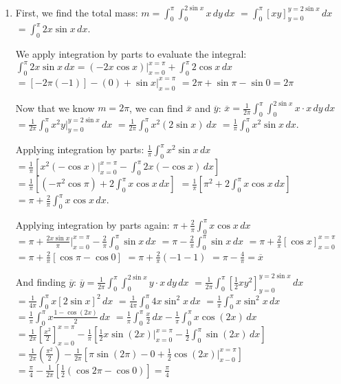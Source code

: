 \begin{Answer}[ref = c_of_m]
\begin{enumerate}
\item First, we find the total mass: $m = \int_0^{\pi} \int_0^{2\sin{x}} x \,dy
\,dx$ 
$= \int_0^{\pi} \left[ xy \right]_{y = 0}^{y = 2\sin{x}}\,dx$ $= \int_0^{\pi} 2
x\sin{x}\,dx$. 

We apply integration by parts to evaluate the integral: 
$\int_0^{\pi} 2x\sin{x}\,dx = \left(-2x \cos{x} \right)|_{x = 0}^{x = \pi} + 
\int_0^{\pi} 2 \cos{x}\,dx$ 
$= \left[-2 \pi (-1) \right] - \left( 0 \right) + \sin{x}|_{x = 0}^{x = \pi}$ 
$= 2\pi + \sin{\pi} - \sin{0} = 2\pi$

Now that we know $m = 2\pi$, we can find $\overline{x}$ and $\overline{y}$: 
$\overline{x} = \frac{1}{2\pi} \int_0^{\pi} \int_0^{2\sin{x}} x \cdot x \,dy 
\,dx$ 
$= \frac{1}{2\pi} \int_0^{\pi} x^2y|_{y = 0}^{y = 2\sin{x}}\,dx$ 
$= \frac{1}{2\pi} \int_0^{\pi} x^2 \left(2\sin{x} \right)\,dx$ 
$= \frac{1}{\pi} \int_0^{\pi} x^2 \sin{x}\,dx$. 

Applying integration by parts: $\frac{1}{\pi} \int_0^{\pi} x^2 \sin{x}\,dx$ 
$= \frac{1}{\pi} \left[ x^2 \left(-\cos{x} \right)|_{x = 0}^{x = \pi} - \int_0^
{\pi} 2x \left( -\cos{x} \right) \,dx \right]$ 
$= \frac{1}{\pi} \left[ \left( -\pi^2 \cos{\pi} \right) + 2\int_0^{\pi} x\cos{x
}\,dx \right]$ 
$= \frac{1}{\pi} \left[ \pi^2 + 2\int_0^{\pi} x\cos{x}\,dx \right]$ $= \pi + 
\frac{2}{\pi} \int_0^{\pi} x\cos{x}\,dx$. 

Applying integration by parts again: $\pi + \frac{2}{\pi} \int_0^{\pi} x\cos{x}
\,dx$ 
$= \pi + \frac{2x\sin{x}}{\pi}|_{x = 0}^{x = \pi} - \frac{2}{\pi} \int_0^{\pi} 
\sin{x}\,dx$
$= \pi -\frac{2}{\pi} \int_0^{\pi} \sin{x}\,dx$
$= \pi + \frac{2}{\pi} \left[ \cos{x} \right]_{x = 0}^{x = \pi}$
$= \pi + \frac{2}{\pi} \left[ \cos{\pi} - \cos{0} \right]$
$= \pi + \frac{2}{\pi} \left(-1 - 1 \right)$ $= \pi - \frac{4}{\pi} = 
\overline{x}$

And finding $\overline{y}$: 
$\overline{y} = \frac{1}{2\pi} \int_0^{\pi} \int_0^{2 \sin{x}} y \cdot x \,dy 
\,dx$
$= \frac{1}{2\pi} \int_0^{\pi} \left[ \frac{1}{2}xy^2 \right]_{y = 0}^{y = 2
\sin{x}} \,dx$
$= \frac{1}{4\pi} \int_0^{\pi} x \left[ 2\sin{x} \right]^2 \,dx$ 
$= \frac{1}{4\pi} \int_0^{\pi} 4x \sin^2{x}\,dx$ 
$= \frac{1}{\pi} \int_0^{\pi} x\sin^2{x}\,dx$ 
$=\frac{1}{\pi} \int_0^{\pi} x \frac{1-\cos{\left(2x\right)}}{2}\,dx$ 
$= \frac{1}{\pi} \int_0^{\pi} \frac{x}{2}\,dx - \frac{1}{\pi} \int_0^{\pi} x 
\cos{(2x)}\,dx$ 
$= \frac{1}{2\pi} \left[ \frac{x^2}{2} \right]_{x = 0}^{x = \pi} - \frac{1}{\pi
} \left[ \frac{1}{2}x\sin{(2x)}|_{x = 0}^{x = \pi} - \frac{1}{2} \int_0^{\pi} 
\sin{(2x)}\,dx \right]$
$= \frac{1}{2\pi} \left( \frac{\pi^2}{2} \right) - \frac{1}{2\pi} \left[ \pi
\sin{(2\pi)} - 0 + \frac{1}{2} \cos{(2x)}|_{x - 0}^{x = \pi} \right]$
$= \frac{\pi}{4} - \frac{1}{2\pi} \left[ \frac{1}{2} \left(\cos{2\pi} - \cos{0}
\right) \right] = \frac{\pi}{4}$


\end{enumerate}
\end{Answer}
